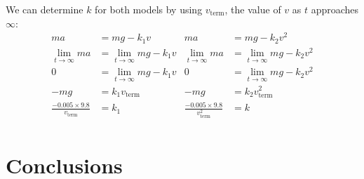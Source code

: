 \documentclass{article}
\begin{document}
\noindent
We can determine $k$ for both models by using $v_\text{term}$, the value of $v$ as $t$ approaches $\infty$:
\begin{align*}
    ma &= mg - k_1v & ma &= mg - k_2v^2 \\
    \lim_{t \rightarrow \infty}{ma} &= \lim_{t \rightarrow \infty}{mg - k_1v} & \lim_{t \rightarrow \infty}{ma} &= \lim_{t \rightarrow \infty}{mg - k_2v^2} \\
    0 &= \lim_{t \rightarrow \infty}{mg - k_1v} & 0 &= \lim_{t \rightarrow \infty}{mg - k_2v^2} \\
    -mg &= k_1v_\text{term} & -mg &= k_2v_{\text{term}}^2 \\
    \frac{-0.005 \times 9.8}{v_\text{term}} &= k_1 & \frac{-0.005 \times 9.8}{v_{\text{term}}^2} &= k \\
\end{align*}


\section{Conclusions}
\end{document}
